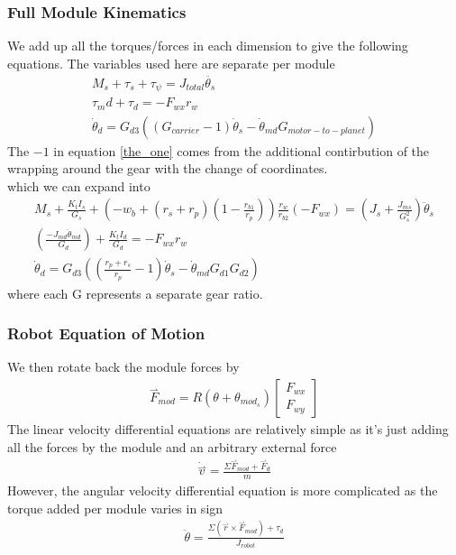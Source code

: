 \documentclass{article}
\newcommand{\harpoon}{\overset{\rightharpoonup}}
\begin{document}
\subsubsection{Full Module Kinematics}
We add up all the torques/forces in each dimension to give the following equations. The variables used here are separate per module
\begin{gather}
    M_s + \tau_s + \tau_\psi = J_{total}\ddot{\theta_s}\\
    \tau_md + \tau_d = -F_{wx}r_w\\
    \dot\theta_d = G_{d3}\left(\left(G_{carrier} - 1\right)\dot\theta_s - \dot\theta_{md}G_{motor-to-planet}\right) \label{the_one}
\end{gather}
The $-1$ in equation \eqref{the_one} comes from the additional contirbution of the wrapping around the gear with the change of coordinates.\\
which we can expand into
\begin{gather}
    M_s + \frac{K_tI_s}{G_s} + \left(-w_b+\left(r_s+r_p\right)\left(1-\frac{r_{b1}}{r_p}\right)\right)\frac{r_w}{r_{b2}}\left(-F_{wx}\right) = \left(J_s + \frac{J_{ms}}{G^2_s}\right)\ddot\theta_s\\
    \left(\frac{-J_{md}\ddot\theta_{md}}{G_d}\right)+\frac{K_{t}I_d}{G_d} = -F_{wx}r_w\\
    \dot\theta_d = G_{d3}\left(\left(\frac{r_p+r_s}{r_p}-1\right)\dot\theta_s - \dot\theta_{md}G_{d1}G_{d2}\right)
\end{gather}
where each G represents a separate gear ratio.
\subsubsection{Robot Equation of Motion}
We then rotate back the module forces by
\begin{gather}
    \harpoon{F}_{mod} = R(\theta + \theta_{mod_s})\begin{bmatrix}
        F_{wx} \\
        F_{wy}
    \end{bmatrix}
\end{gather}
The linear velocity differential equations are relatively simple as it's just adding all the forces by the module and an arbitrary external force
\begin{gather}
    \dot{\harpoon{v}} = \frac{\Sigma \harpoon{F}_{mod} + \harpoon{F}_{d}}{m}
\end{gather}
However, the angular velocity differential equation is more complicated as the torque added per module varies in sign
\begin{gather}
    \ddot{\theta} = \frac{\Sigma\left(\harpoon{r} \times \harpoon{F}_{mod}\right) + \tau_{d}}{J_{robot}}
\end{gather}
\newpage
\printbibliography
\end{document}
